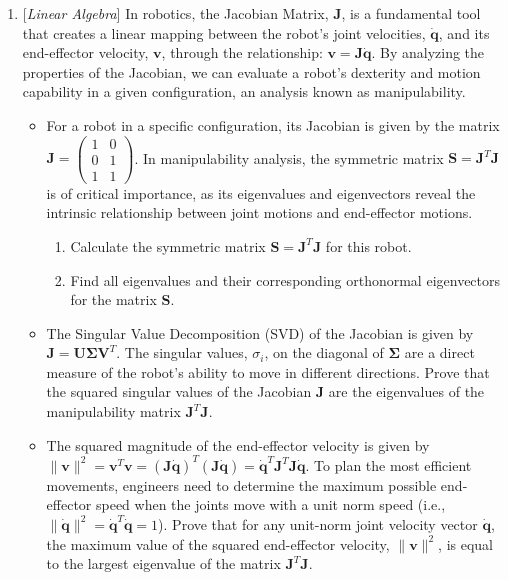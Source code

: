 \documentclass[10pt]{article}
\newcommand{\vectdot}[1]{\dot{\mathbf{#1}}}
\begin{document}
\begin{enumerate}
\item {} {[}\textit{Linear Algebra}{]} In robotics, the Jacobian Matrix, $\mathbf{J}$, is a fundamental tool that creates a linear mapping between the robot's joint velocities, $\vectdot{q}$, and its end-effector velocity, $\mathbf{v}$, through the relationship: $\mathbf{v} = \mathbf{J}\vectdot{q}$. By analyzing the properties of the Jacobian, we can evaluate a robot's dexterity and motion capability in a given configuration, an analysis known as manipulability.


\begin{itemize}
\item[(a)]  For a robot in a specific configuration, its Jacobian is given by the matrix $\mathbf{J} = \begin{pmatrix} 1 & 0 \\ 0 & 1 \\ 1 & 1 \end{pmatrix}$. In manipulability analysis, the symmetric matrix $\mathbf{S} = \mathbf{J}^T \mathbf{J}$ is of critical importance, as its eigenvalues and eigenvectors reveal the intrinsic relationship between joint motions and end-effector motions.

\begin{enumerate}
    \item Calculate the symmetric matrix $\mathbf{S} = \mathbf{J}^T \mathbf{J}$ for this robot.
    \item Find all eigenvalues and their corresponding orthonormal eigenvectors for the matrix $\mathbf{S}$.
\end{enumerate}

\item[(b)]  The Singular Value Decomposition (SVD) of the Jacobian is given by $\mathbf{J} = \mathbf{U}\boldsymbol{\Sigma} \mathbf{V}^T$. The singular values, $\sigma_i$, on the diagonal of $\boldsymbol{\Sigma}$ are a direct measure of the robot's ability to move in different directions.
Prove that the squared singular values of the Jacobian $\mathbf{J}$ are the eigenvalues of the manipulability matrix $\mathbf{J}^T \mathbf{J}$. 

\item[(c)] The squared magnitude of the end-effector velocity is given by $\|\mathbf{v}\|^2 = \mathbf{v}^T \mathbf{v} = (\mathbf{J}\vectdot{q})^T(\mathbf{J}\vectdot{q}) = \vectdot{q}^T \mathbf{J}^T \mathbf{J} \vectdot{q}$. To plan the most efficient movements, engineers need to determine the maximum possible end-effector speed when the joints move with a unit norm speed (i.e., $\|\vectdot{q}\|^2 = \vectdot{q}^T\vectdot{q} = 1$).
Prove that for any unit-norm joint velocity vector $\vectdot{q}$, the maximum value of the squared end-effector velocity, $\|\mathbf{v}\|^2$, is equal to the largest eigenvalue of the matrix $\mathbf{J}^T \mathbf{J}$.
\end{itemize}


\end{enumerate}
\end{document}
